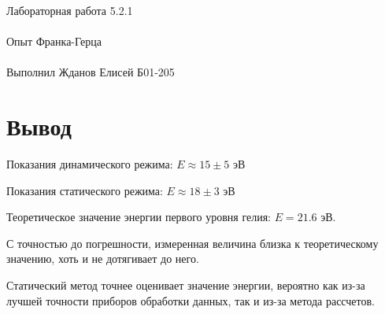 \documentclass{astroedu-lab}
\begin{document}
\begin{problem}{\huge Лабораторная работа 5.2.1\\\\Опыт Франка-Герца\\\\Выполнил Жданов Елисей Б01-205}

\section{Вывод}

Показания динамического режима: $E \approx 15 \pm 5 \text{ эВ}$

Показания статического режима: $E \approx 18 \pm 3 \text{ эВ}$

Теоретическое значение энергии первого уровня гелия: $E = 21.6$ эВ.

С точностью до погрешности, измеренная величина близка к теоретическому значению, хоть и не дотягивает до него.

Статический метод точнее оценивает значение энергии, вероятно как из-за лучшей точности приборов обработки данных, так и из-за метода рассчетов.


\end{problem}
\end{document}
